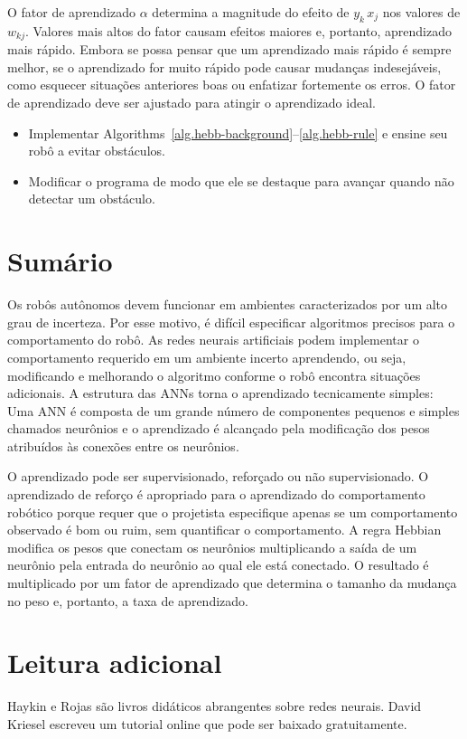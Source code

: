 O fator de aprendizado $\alpha$ determina a magnitude do efeito de $y_k\, x_j$ nos valores de $w_{kj}$. Valores mais altos do fator causam efeitos maiores e, portanto, aprendizado mais rápido. Embora se possa pensar que um aprendizado mais rápido é sempre melhor, se o aprendizado for muito rápido pode causar mudanças indesejáveis, como esquecer situações anteriores boas ou enfatizar fortemente os erros. O fator de aprendizado deve ser ajustado para atingir o aprendizado ideal.

\begin{framed}
\begin{itemize}
\item Implementar Algorithms~\ref{alg.hebb-background}--\ref{alg.hebb-rule} e ensine seu robô a evitar obstáculos.
\item Modificar o programa de modo que ele se destaque para avançar quando não detectar um obstáculo.
\end{itemize}
\end{framed}

\section{Sumário}

Os robôs autônomos devem funcionar em ambientes caracterizados por um alto grau de incerteza. Por esse motivo, é difícil especificar algoritmos precisos para o comportamento do robô. As redes neurais artificiais podem implementar o comportamento requerido em um ambiente incerto aprendendo, ou seja, modificando e melhorando o algoritmo conforme o robô encontra situações adicionais. A estrutura das ANNs torna o aprendizado tecnicamente simples: Uma ANN é composta de um grande número de componentes pequenos e simples chamados neurônios e o aprendizado é alcançado pela modificação dos pesos atribuídos às conexões entre os neurônios.

O aprendizado pode ser supervisionado, reforçado ou não supervisionado. O aprendizado de reforço é apropriado para o aprendizado do comportamento robótico porque requer que o projetista especifique apenas se um comportamento observado é bom ou ruim, sem quantificar o comportamento. A regra Hebbian modifica os pesos que conectam os neurônios multiplicando a saída de um neurônio pela entrada do neurônio ao qual ele está conectado. O resultado é multiplicado por um fator de aprendizado que determina o tamanho da mudança no peso e, portanto, a taxa de aprendizado.

\section{Leitura adicional}

Haykin \cite{haykin} e Rojas \cite{rojas} são livros didáticos abrangentes sobre redes neurais. David Kriesel escreveu um tutorial online \cite{kriesel} que pode ser baixado gratuitamente.
